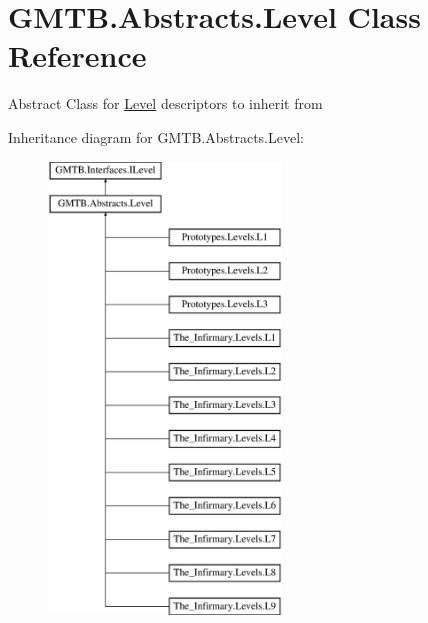 \hypertarget{class_g_m_t_b_1_1_abstracts_1_1_level}{}\section{G\+M\+T\+B.\+Abstracts.\+Level Class Reference}
\label{class_g_m_t_b_1_1_abstracts_1_1_level}


Abstract Class for \mbox{\hyperlink{class_g_m_t_b_1_1_abstracts_1_1_level}{Level}} descriptors to inherit from  


Inheritance diagram for G\+M\+T\+B.\+Abstracts.\+Level\+:\begin{figure}[H]
\begin{center}
\leavevmode
\includegraphics[height=12.000000cm]{class_g_m_t_b_1_1_abstracts_1_1_level}
\end{center}
\end{figure}
